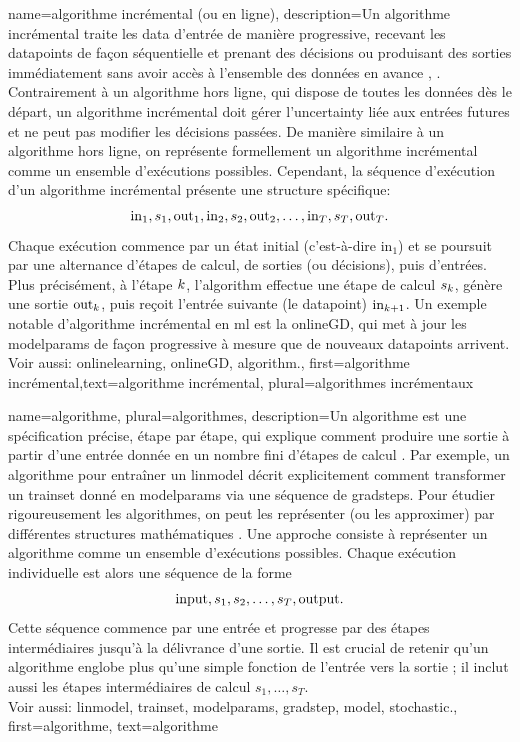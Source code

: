 {name={algorithme incrémental (ou en ligne)},
	description={Un algorithme incrémental traite les \gls{data} d’entrée de manière progressive, recevant les \glspl{datapoint} de façon séquentielle et prenant des décisions ou produisant des sorties immédiatement sans avoir accès à l’ensemble des données en avance \cite{PredictionLearningGames}, \cite{HazanOCO}. Contrairement à un algorithme hors ligne, qui dispose de toutes les données dès le départ, un algorithme incrémental doit gérer l’\gls{uncertainty} liée aux entrées futures et ne peut pas modifier les décisions passées.  
		De manière similaire à un algorithme hors ligne, on représente formellement un algorithme incrémental comme un ensemble d’exécutions possibles. Cependant, la séquence d’exécution d’un algorithme incrémental présente une structure spécifique:  
		$${\rm in}_{1}, s_1, {\rm out}_{1}, {\rm in}_{2}, s_2, {\rm out}_{2}, \ldots, {\rm in}_{T}, s_T, {\rm out}_{T}.$$  
		Chaque exécution commence par un état initial (c’est-à-dire \(\text{in}_{1}\)) et se poursuit par une alternance d’étapes de calcul, de sorties (ou décisions), puis d’entrées. Plus précisément, à l’étape \(k\), l’\gls{algorithm} effectue une étape de calcul \(s_{k}\), génère une sortie \(\text{out}_{k}\), puis reçoit l’entrée suivante (le \gls{datapoint}) \(\text{in}_{k+1}\).  
		Un exemple notable d’algorithme incrémental en \gls{ml} est la \gls{onlineGD}, qui met à jour les \glspl{modelparam} de façon progressive à mesure que de nouveaux \glspl{datapoint} arrivent.  
		\\ Voir aussi: \gls{onlinelearning}, \gls{onlineGD}, \gls{algorithm}.},
	first={algorithme incrémental},text={algorithme incrémental}, plural={algorithmes incrémentaux}}

{name={algorithme}, plural={algorithmes},
	description={Un algorithme est une spécification précise, étape par étape, qui explique comment produire une sortie à partir d’une entrée donnée en un nombre fini d’étapes de calcul \cite{Cormen:2022aa}.  
		Par exemple, un algorithme pour entraîner un \gls{linmodel} décrit explicitement comment transformer un \gls{trainset} donné en \glspl{modelparam} via une séquence de \glspl{gradstep}.  
		Pour étudier rigoureusement les algorithmes, on peut les représenter (ou les approximer) par différentes structures mathématiques \cite{Sipser2013}.  
		Une approche consiste à représenter un algorithme comme un ensemble d’exécutions possibles. Chaque exécution individuelle est alors une séquence de la forme $${\rm input}, s_1, s_2, \ldots, s_T, {\rm output}.$$  
		Cette séquence commence par une entrée et progresse par des étapes intermédiaires jusqu’à la délivrance d’une sortie.  
		Il est crucial de retenir qu'un algorithme englobe plus qu’une simple fonction de l’entrée vers la sortie ; il inclut aussi les étapes intermédiaires de calcul $s_1, \ldots, s_T$.
		\\
		Voir aussi: \gls{linmodel}, \gls{trainset}, \glspl{modelparam}, \gls{gradstep}, \gls{model}, \gls{stochastic}.},
	first={algorithme},
	text={algorithme}
}

